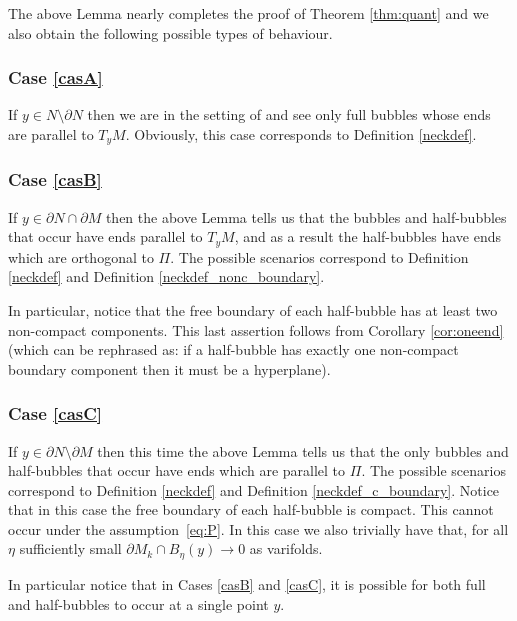 \documentclass[10pt]{amsart}
\newcounter{cas}
\renewcommand{\thecas}{\Roman{cas}}
\theoremstyle{definition}
\begin{document}
The above Lemma nearly completes the proof of Theorem \ref{thm:quant} and we also obtain the following possible types of behaviour.

\renewcommand{\thecas}{\Alph{cas}}
\subsubsection*{\label{casA}Case \ref{casA}} If $y\in N\setminus \partial N$ then we are in the setting of \cite{BS17} and see only full bubbles whose ends are parallel to $T_y M$. Obviously, this case corresponds to Definition \ref{neckdef}. 

\subsubsection*{\label{casB}Case \ref{casB}} If $y\in \partial N\cap \partial M$ then the above Lemma tells us that
the bubbles and half-bubbles that occur have ends parallel to $T_y M$, and as a result the half-bubbles have ends which are orthogonal to $\Pi$. The possible scenarios correspond to Definition \ref{neckdef} and Definition \ref{neckdef_nonc_boundary}.

In particular, notice that the free boundary of each half-bubble has at least two non-compact components. This last assertion follows from Corollary \ref{cor:oneend} (which can be rephrased as: if a half-bubble has exactly one non-compact boundary component then it must be a hyperplane). 

\subsubsection*{\label{casC}Case \ref{casC}} If $y\in \partial N\setminus \partial M$ then this time the above Lemma tells us that the only bubbles and half-bubbles that occur have ends which are parallel to $\Pi$. The possible scenarios correspond to Definition \ref{neckdef} and Definition \ref{neckdef_c_boundary}.
Notice that in this case the free boundary of each half-bubble is compact. This cannot occur under the assump\-tion~\eqref{eq:P}. In this case we also trivially have that, for all $\eta$ sufficiently small \hbox{$\partial M_k\cap B_\eta(y) \to 0$} as varifolds. 

In particular notice that in Cases \ref{casB} and \ref{casC}, it is possible for both full and half-bubbles to occur at a single point $y$.
\end{document}
